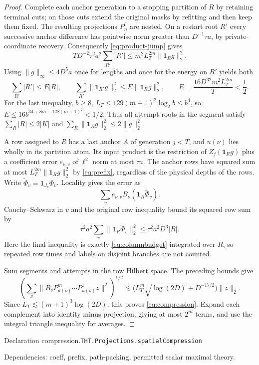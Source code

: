 \documentclass[11pt]{article}
\theoremstyle{definition}
\newcommand{\one}{\mathbf 1}
\numberwithin{equation}{section}
\newcommand{\bp}[3]{\par\smallskip\begingroup\footnotesize
\noindent\hypertarget{bp:#1}{\textsf{Declaration #1.}}\quad\nolinkurl{#2}\par
\noindent\textsf{Dependencies:} #3.\par\endgroup\smallskip}
\begin{document}
\begin{proof}
Complete each anchor generation to a stopping partition of $R$ by retaining terminal cuts; on those cuts extend the original masks by refitting and then keep them fixed. The resulting projections $P_n^i$ are nested. On a restart root $R'$ every successive anchor difference has pointwise norm greater than $D^{-1}\tau a$, by private-coordinate recovery. Consequently \eqref{eq:product-jump} gives
\[
 TD^{-2}\tau^2a^2\sum_{R'}|R'|\le m^2L_T^{2m}\|\one_Rg\|_2^2.
\]
Using $\|g\|_\infty\le4D^5a$ once for lengths and once for the energy on $R'$ yields both
\[
 \sum_{R'}|R'|\le E|R|,\qquad
 \sum_{R'}\|\one_{R'}g\|_2^2\le E\|\one_Rg\|_2^2,
 \qquad E=\frac{16D^{32}m^2L_T^{2m}}{T}<\frac12.
\]
For the last inequality, $b\ge8$, $L_T\le129(m+1)^2\log_2b\le b^4$, so $E\le16b^{34+8m-128(m+1)^2}<1/2$. Thus all attempt roots in the segment satisfy $\sum_R|R|\le2|K|$ and $\sum_R\|\one_Rg\|_2^2\le2\|g\|_2^2$.

A row assigned to $R$ has a last anchor $A$ of generation $j<T$, and $u(\nu)$ lies wholly in its partition atom. Its input product is the restriction of $Z_j(\one_Rg)$ plus a coefficient error $e_{\nu,v}$ of $\ell^2$ norm at most $\tau a$. The anchor rows have squared sum at most $L_T^{2m}\|\one_Rg\|_2^2$ by \eqref{eq:prefix}, regardless of the physical depths of the rows. Write $\widetilde\Phi_v=\one_{J_v}\Phi_v$. Locality gives the error as
\[
 \sum_ve_{\nu,v}B_\nu(\one_R\widetilde\Phi_v).
\]
Cauchy--Schwarz in $v$ and the original row inequality bound its squared row sum by
\[
 \tau^2a^2\sum_v\|\one_R\widetilde\Phi_v\|_2^2
 \le\tau^2a^2D^3|R|.
\]
Here the final inequality is exactly \eqref{eq:columnbudget} integrated over $R$, so repeated row times and labels on disjoint branches are not counted.

Sum segments and attempts in the row Hilbert space. The preceding bounds give
\[
 \left(\sum_\nu\|B_\nu P_{u(\nu)}^m\cdots P_{u(\nu)}^1z\|^2\right)^{1/2}
 \lesssim\bigl(L_T^m\sqrt{\log(2D)}+D^{-17/2}\bigr)\|z\|_2.
\]
Since $L_T\lesssim(m+1)^3\log(2D)$, this proves \eqref{eq:compression}. Expand each complement into identity minus projection, giving at most $2^m$ terms, and use the integral triangle inequality for averages.
\end{proof}
\bp{compression}{THT.Projections.spatialCompression}{coeff, prefix, path-packing, permitted scalar maximal theory}
\end{document}
